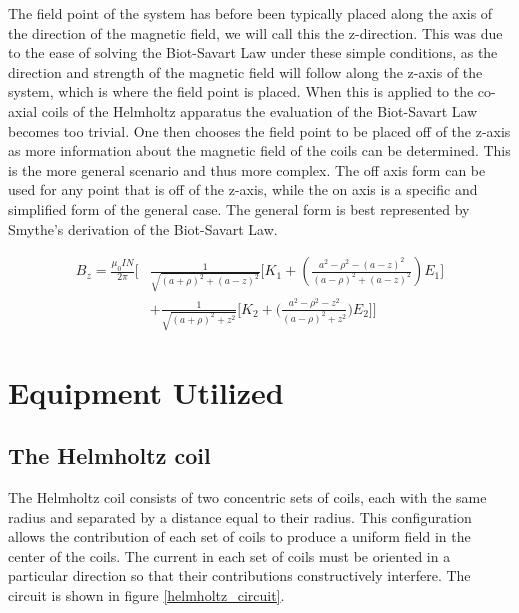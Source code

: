 \documentclass[a4paper]{article}
\begin{document}
The field point of the system has before been typically placed along the axis of the direction of the magnetic field, we will call this the z-direction. This was due to the ease of solving the Biot-Savart Law under these simple conditions, as the direction and strength of the magnetic field will follow along the z-axis of the system, which is where the field point is placed. When this is applied to the co-axial coils of the Helmholtz apparatus the evaluation of the Biot-Savart Law becomes too trivial. One then chooses the field point to be placed off of the z-axis as more information about the magnetic field of the coils can be determined. This is the more general scenario and thus more complex. The off axis form can be used for any point that is off of the z-axis, while the on axis is a specific and simplified form of the general case. The general form is best represented by Smythe's derivation of the Biot-Savart Law. 

\begin{align*} 
B_z = \frac{\mu_0IN}{2\pi}
\Big[&
    \frac{1}{\sqrt{(a+\rho)^2 + (a-z)^2}}
    \big[
        K_1 + \left(\frac{a^2 -\rho^2 - (a - z)^2}{(a-\rho)^2 + (a - z)^2} \right) E_1 
    \big]\\
    & + \frac{1}{\sqrt{(a + \rho)^2 + z^2}}
    \big[
        K_2 + \big(\frac{a^2 - \rho^2 - z^2}{(a - \rho)^2 + z^2}\big) E_2 
    \big] 
\Big]
\end{align*}

\section{Equipment Utilized}


\subsection{The Helmholtz coil}

The Helmholtz coil consists of two concentric sets of coils, each with the same radius and separated by a distance equal to their radius. This configuration allows the contribution of each set of coils to produce a uniform field in the center of the coils. The current in each set of coils must be oriented in a particular direction so that their contributions constructively interfere. The circuit is shown in figure \ref{helmholtz_circuit}. 
\end{document}
